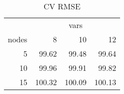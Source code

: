 \begin{table}

\caption{\label{tab:RF CV}CV RMSE}
\centering
\begin{tabular}[t]{r|r|r|r}
\hline
\multicolumn{1}{c|}{ } & \multicolumn{3}{c}{vars} \\
\cline{2-4}
nodes & 8 & 10 & 12\\
\hline
5 & 99.62 & 99.48 & 99.64\\
\hline
10 & 99.96 & 99.91 & 99.82\\
\hline
15 & 100.32 & 100.09 & 100.13\\
\hline
\end{tabular}
\end{table}